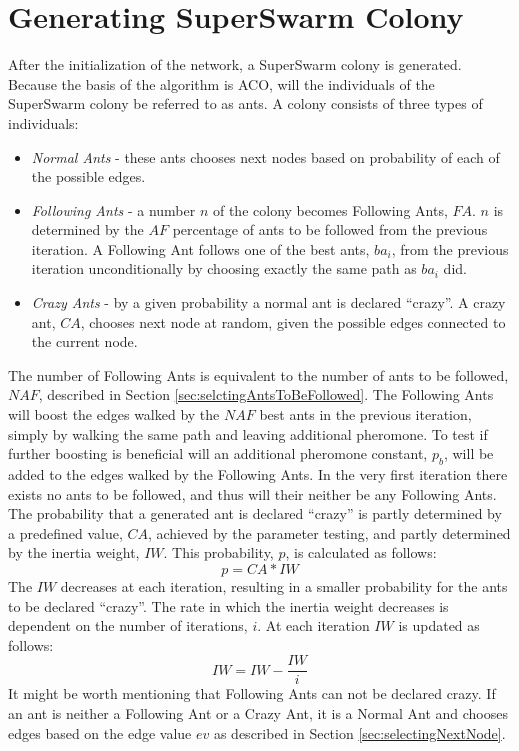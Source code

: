 \section{Generating SuperSwarm Colony}
\label{sec:algoGeneratingSuperSwarm}
After the initialization of the network, a SuperSwarm colony is generated. Because the basis of the algorithm is ACO, will the individuals of the SuperSwarm colony be referred to as ants. A colony consists of three types of individuals:
\begin{itemize}
\item \textit{Normal Ants} - these ants chooses next nodes based on probability of each of the possible edges. 
\item \textit{Following Ants} - a number $n$ of the colony becomes Following Ants, $FA$. $n$ is determined by the $AF$ percentage of ants to be followed from the previous iteration. A Following Ant follows one of the best ants, $ba_i$, from the previous iteration unconditionally by choosing exactly the same path as $ba_i$ did.
\item \textit{Crazy Ants} - by a given probability a normal ant is declared ``crazy''. A crazy ant, $CA$, chooses next node at random, given the possible edges connected to the current node.  
\end{itemize}
The number of Following Ants is equivalent to the number of ants to be followed, $NAF$, described in Section \vref{sec:selctingAntsToBeFollowed}. The Following Ants will boost the edges walked by the $NAF$ best ants in the previous iteration, simply by walking the same path and leaving additional pheromone. To test if further boosting is beneficial will an additional pheromone constant, $p_b$, will be added to the edges walked by the Following Ants. In the very first iteration there exists no ants to be followed, and thus will their neither be any Following Ants. 
\newline
\newline
The probability that a generated ant is declared ``crazy'' is partly determined by a predefined value, $CA$, achieved by the parameter testing, and partly determined by the inertia weight, $IW$. This probability, $p$, is calculated as follows:
$$p = CA*IW$$
The $IW$ decreases at each iteration, resulting in a smaller probability for the ants to be declared ``crazy''. The rate in which the inertia weight decreases is dependent on the number of iterations, $i$. At each iteration $IW$ is updated as follows:
$$IW = IW - \frac{IW}{i}$$
It might be worth mentioning that Following Ants can not be declared crazy. 
\newline
\newline
If an ant is neither a Following Ant or a Crazy Ant, it is a Normal Ant and chooses edges based on the edge value $ev$ as described in Section \vref{sec:selectingNextNode}.
